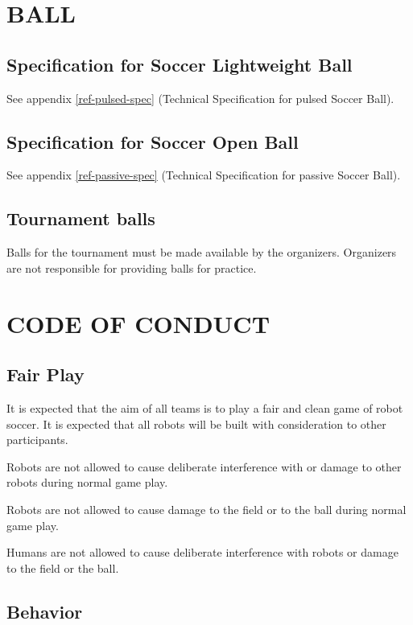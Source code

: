\documentclass{article}
\begin{document}
\section{BALL \label{ref-038}}

\subsection{ Specification for Soccer Lightweight Ball}

See appendix \ref{ref-pulsed-spec} (Technical Specification for pulsed Soccer Ball).

\subsection{Specification for Soccer Open Ball}

See appendix \ref{ref-passive-spec} (Technical Specification for passive Soccer Ball).

\subsection{ Tournament balls \label{ref-039}}

Balls for the tournament must be made available by the organizers. Organizers are not responsible for providing balls for practice.

\section{CODE OF CONDUCT\label{ref-040}}

\subsection{ Fair Play \label{ref-041}}

It is expected that the aim of all teams is to play a fair and clean game of robot soccer. It is expected that all robots will be built with consideration to other participants.

Robots are not allowed to cause deliberate interference with or damage to other robots during normal game play.

Robots are not allowed to cause damage to the field or to the ball during normal game play.

Humans are not allowed to cause deliberate interference with robots or damage to the field or the ball.

\subsection{ Behavior \label{ref-042}}
\end{document}
